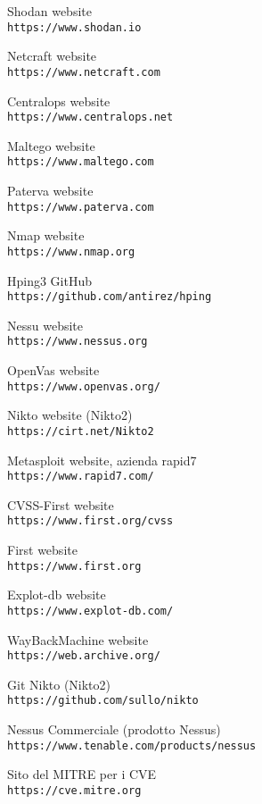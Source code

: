 \documentclass[a4paper,12pt]{article}
\begin{document}
\begin{thebibliography}{20}
Shodan website
\\\texttt{https://www.shodan.io}

Netcraft website
\\\texttt{https://www.netcraft.com}

Centralops website
\\\texttt{https://www.centralops.net}

Maltego website
\\\texttt{https://www.maltego.com}

Paterva website
\\\texttt{https://www.paterva.com}

Nmap website
\\\texttt{https://www.nmap.org}

Hping3 GitHub
\\\texttt{https://github.com/antirez/hping}

Nessu website
\\\texttt{https://www.nessus.org}

OpenVas website
\\\texttt{https://www.openvas.org/}

Nikto website (Nikto2)
\\\texttt{https://cirt.net/Nikto2}

Metasploit website, azienda rapid7
\\\texttt{https://www.rapid7.com/}

CVSS-First website 
\\\texttt{https://www.first.org/cvss}

First website
\\\texttt{https://www.first.org}

Explot-db website
\\\texttt{https://www.explot-db.com/}

WayBackMachine website
\\\texttt{https://web.archive.org/}

Git Nikto (Nikto2)
\\\texttt{https://github.com/sullo/nikto}

Nessus Commerciale (prodotto Nessus)
\\\texttt{https://www.tenable.com/products/nessus}

Sito del MITRE per i CVE
\\\texttt{https://cve.mitre.org}

\end{thebibliography}
\end{document}
